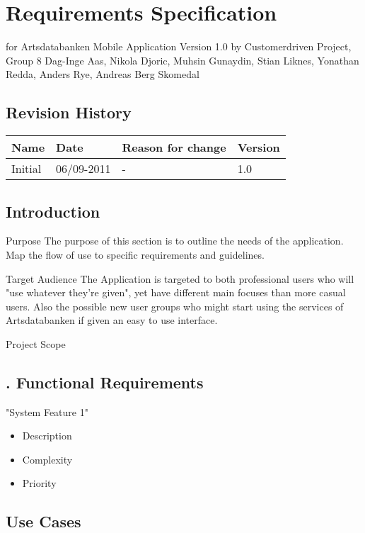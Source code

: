 \section{Requirements Specification}
\indent for Artsdatabanken Mobile Application
\indent\indent Version 1.0
\indent by Customerdriven Project, Group 8
\indent\indent Dag-Inge Aas, Nikola Djoric, Muhsin Gunaydin, Stian Liknes, Yonathan Redda, Anders Rye, Andreas Berg Skomedal
\pagebreak

\subsection{Revision History}
\begin{tabular}[t]{|l|l|l|l|}\hline
Name&Date&Reason for change&Version\\\hline\hline
Initial&06/09-2011&-&1.0\\\hline
\end{tabular}

\pagebreak

\subsection{ Introduction}

\large{ Purpose}
	The purpose of this section is to outline the needs of the application. Map the flow of use to specific requirements and guidelines.

\large{ Target Audience}
	The Application is targeted to both professional users who will "use whatever they're given", yet have different main focuses than more casual users. Also the possible new user groups who might start using the services of Artsdatabanken if given an easy to use interface.

\large{ Project Scope}

\pagebreak

\subsection{. Functional Requirements}
	\large{ "System Feature 1"}
	\begin{itemize}
		\item  Description
		\item  Complexity
		\item  Priority
	\end{itemize}

\pagebreak

\subsection{ Use Cases}

